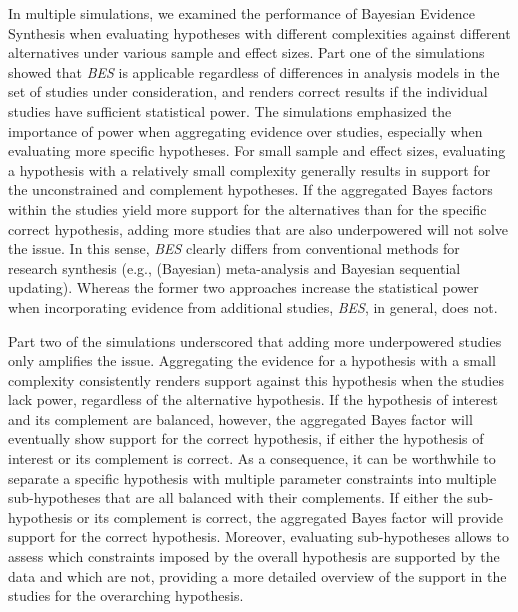 \documentclass[review, 3p, authoryear]{elsarticle} %
\begin{document}
In multiple simulations, we examined the performance of Bayesian Evidence Synthesis when evaluating hypotheses with different complexities against different alternatives under various sample and effect sizes.
Part one of the simulations showed that \emph{BES} is applicable regardless of differences in analysis models in the set of studies under consideration, and renders correct results if the individual studies have sufficient statistical power.
The simulations emphasized the importance of power when aggregating evidence over studies, especially when evaluating more specific hypotheses.
For small sample and effect sizes, evaluating a hypothesis with a relatively small complexity generally results in support for the unconstrained and complement hypotheses.
If the aggregated Bayes factors within the studies yield more support for the alternatives than for the specific correct hypothesis, adding more studies that are also underpowered will not solve the issue.
In this sense, \emph{BES} clearly differs from conventional methods for research synthesis (e.g., (Bayesian) meta-analysis and Bayesian sequential updating).
Whereas the former two approaches increase the statistical power when incorporating evidence from additional studies, \emph{BES}, in general, does not.

Part two of the simulations underscored that adding more underpowered studies only amplifies the issue.
Aggregating the evidence for a hypothesis with a small complexity consistently renders support against this hypothesis when the studies lack power, regardless of the alternative hypothesis.
If the hypothesis of interest and its complement are balanced, however, the aggregated Bayes factor will eventually show support for the correct hypothesis, if either the hypothesis of interest or its complement is correct.
As a consequence, it can be worthwhile to separate a specific hypothesis with multiple parameter constraints into multiple sub-hypotheses that are all balanced with their complements.
If either the sub-hypothesis or its complement is correct, the aggregated Bayes factor will provide support for the correct hypothesis.
Moreover, evaluating sub-hypotheses allows to assess which constraints imposed by the overall hypothesis are supported by the data and which are not, providing a more detailed overview of the support in the studies for the overarching hypothesis.
\end{document}
